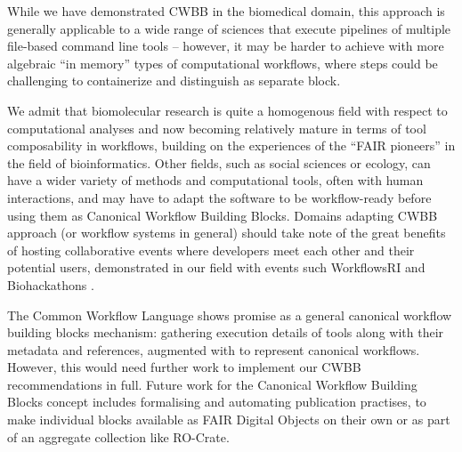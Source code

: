 While we have demonstrated CWBB in the biomedical domain, this approach is generally applicable to a wide range of sciences that execute pipelines of multiple file-based command line tools -- however, it may be harder to achieve with more algebraic ``in memory'' types of computational workflows, where steps could be challenging to containerize and distinguish as separate block.

We admit that biomolecular research is quite a homogenous field with respect to computational analyses and now becoming relatively mature in terms of tool composability in workflows, building on the experiences of the ``FAIR pioneers'' in the field of bioinformatics.
Other fields, such as social sciences or ecology, can have a wider variety of methods and computational tools, often with human interactions, and may have to adapt the software to be workflow-ready \cite{ch6-37} before using them as Canonical Workflow Building Blocks.
Domains adapting CWBB approach (or workflow systems in general) should take note of the great benefits of hosting collaborative events where developers meet each other and their potential users, demonstrated in our field with events such WorkflowsRI \cite{ch6-39} and Biohackathons \cite{ch6-40}.

The Common Workflow Language shows promise as a general canonical workflow building blocks mechanism: gathering execution details of tools along with their metadata and references, augmented with  to represent canonical workflows.
However, this would need further work to implement our CWBB recommendations in full.
Future work for the Canonical Workflow Building Blocks concept includes formalising and automating publication practises, to make individual blocks available as FAIR Digital Objects on their own or as part of an aggregate collection like RO-Crate.
